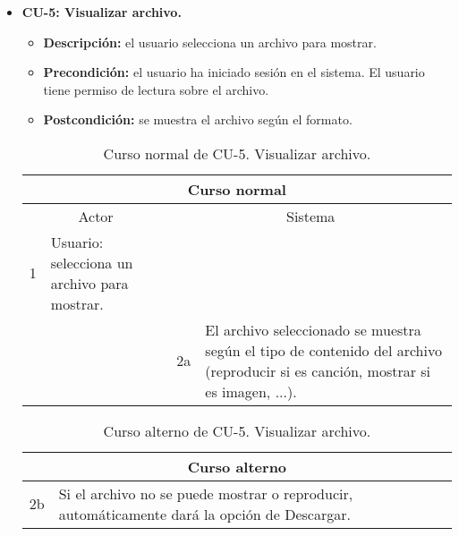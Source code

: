 \begin{itemize}
	\item \textbf{CU-5: Visualizar archivo.}
	\begin{itemize}
		\item \textbf{Descripción:} el usuario selecciona un archivo para mostrar.
		\item \textbf{Precondición:} el usuario ha iniciado sesión en el sistema. El usuario tiene permiso de lectura sobre el archivo.
		\item \textbf{Postcondición:} se muestra el archivo según el formato.
	\end{itemize}
	\begin{table}[H]
		\centering
		\begin{tabular}{|p{0.3cm}|p{5cm}|p{0.3cm}|p{5cm}|}
			\hline
			\multicolumn{4}{|c|}{Curso normal} \\ \hline
			\multicolumn{2}{|c|}{Actor} & \multicolumn{2}{|c|}{Sistema} \\ \hline
			1 & Usuario: selecciona un archivo para mostrar. &  &  \\ \hline
			&  & 2a & El archivo seleccionado se muestra según el tipo de contenido del archivo (reproducir si es canción, mostrar si es imagen, ...). \\ \hline
		\end{tabular}
		\caption{Curso normal de CU-5. Visualizar archivo.}
		\label{tabla:cu5-normal}
	\end{table}
	
	\begin{table}[H]
		\centering
		\begin{tabular}{|p{0.3cm}|p{10cm}|}
			\hline
			\multicolumn{2}{|c|}{Curso alterno} \\ \hline
			2b & Si el archivo no se puede mostrar o reproducir, automáticamente dará la opción de Descargar. \\ \hline
		\end{tabular}
		\caption{Curso alterno de CU-5. Visualizar archivo.}
		\label{tabla:cu5-alterno}
	\end{table}
\end{itemize}

